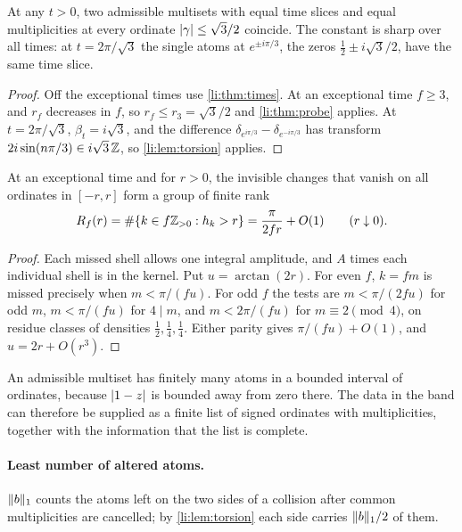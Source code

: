\begin{corollary}\label{li:cor:band}
At any $t>0$, two admissible multisets with equal time slices and equal multiplicities at every ordinate
$\lvert\gamma\rvert\le\sqrt3/2$ coincide. The constant is sharp over all times: at $t=2\pi/\sqrt3$ the single atoms at
$e^{\pm i\pi/3}$, the zeros $\frac12\pm i\sqrt3/2$, have the same time slice.
\end{corollary}

\begin{proof}
Off the exceptional times use \cref{li:thm:times}. At an exceptional time $f\ge3$, and $r_f$ decreases in $f$, so
$r_f\le r_3=\sqrt3/2$ and \cref{li:thm:probe} applies. At $t=2\pi/\sqrt3$, $\beta_t=i\sqrt3$, and the difference
$\delta_{e^{i\pi/3}}-\delta_{e^{-i\pi/3}}$ has transform $2i\sin(n\pi/3)\in i\sqrt3\,\mathbb{Z}$, so \cref{li:lem:torsion} applies.
\end{proof}

\begin{corollary}\label{li:cor:rank}
At an exceptional time and for $r>0$, the invisible changes that vanish on all ordinates in $[-r,r]$ form a group
of finite rank
\[
 R_f(r)=\#\{k\in f\mathbb{Z}_{>0}:h_k>r\}=\frac\pi{2fr}+O(1)\qquad(r\downarrow0).
\]
\end{corollary}

\begin{proof}
Each missed shell allows one integral amplitude, and $A$ times each individual shell is in the kernel. Put
$u=\arctan(2r)$. For even $f$, $k=fm$ is missed precisely when $m<\pi/(fu)$. For odd $f$ the tests are $m<\pi/(2fu)$
for odd $m$, $m<\pi/(fu)$ for $4\mid m$, and $m<2\pi/(fu)$ for $m\equiv2\pmod4$, on residue classes of densities
$\frac12,\frac14,\frac14$. Either parity gives $\pi/(fu)+O(1)$, and $u=2r+O(r^3)$.
\end{proof}

An admissible multiset has finitely many atoms in a bounded interval of ordinates, because $\lvert1-z\rvert$ is bounded
away from zero there. The data in the band can therefore be supplied as a finite list of signed ordinates with
multiplicities, together with the information that the list is complete.

\paragraph{Least number of altered atoms.}
$\lVert b\rVert_1$ counts the atoms left on the two sides of a collision after common multiplicities are cancelled; by
\cref{li:lem:torsion} each side carries $\lVert b\rVert_1/2$ of them.

